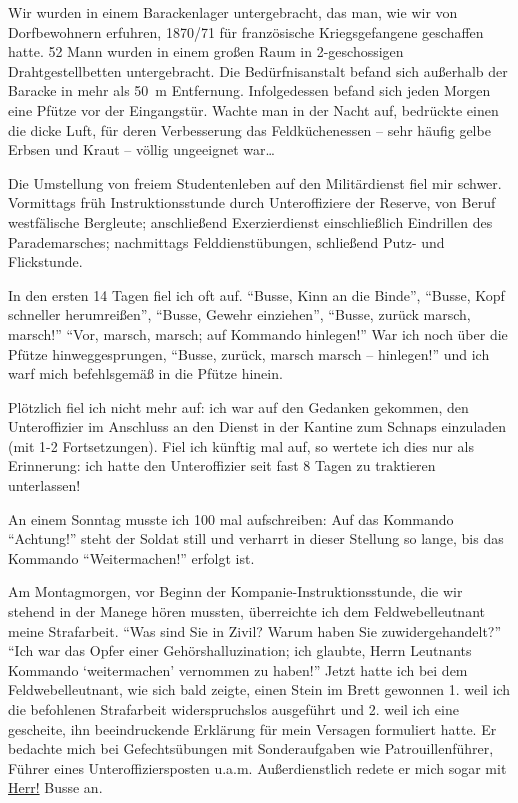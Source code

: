 \documentclass[a5paper,pagesize,10pt,twoside=true]{scrbook}
\begin{document}
Wir wurden in einem Barackenlager untergebracht, das man, wie wir von Dorfbewohnern erfuhren, 1870/71 für französische Kriegsgefangene geschaffen hatte. 52 Mann wurden in einem großen Raum in 2-geschossigen Drahtgestellbetten untergebracht. Die Bedürfnisanstalt befand sich außerhalb der Baracke in mehr als 50~m Entfernung. Infolgedessen befand sich jeden Morgen eine Pfütze vor der Eingangstür. Wachte man in der Nacht auf, bedrückte einen die dicke Luft, für deren Verbesserung das Feldküchenessen -- sehr häufig gelbe Erbsen und Kraut -- völlig ungeeignet war\dots

Die Umstellung von freiem Studentenleben auf den Militärdienst fiel mir schwer. Vormittags früh Instruktionsstunde durch Unteroffiziere der Reserve, von Beruf westfälische Bergleute; anschließend Exerzierdienst einschließlich Eindrillen des Parademarsches; nachmittags Felddienstübungen, schließend Putz- und Flickstunde.

In den ersten 14 Tagen fiel ich oft auf. \enquote{Busse, Kinn an die Binde}, \enquote{Busse, Kopf schneller herumreißen}, \enquote{Busse, Gewehr einziehen}, \enquote{Busse, zurück marsch, marsch!} \enquote{Vor, marsch, marsch; auf Kommando hinlegen!} War ich noch über die Pfütze hinweggesprungen, \enquote{Busse, zurück, marsch marsch -- hinlegen!} und ich warf mich befehlsgemäß in die Pfütze hinein.

Plötzlich fiel ich nicht mehr auf: ich war auf den Gedanken gekommen, den Unteroffizier im Anschluss an den Dienst in der Kantine zum Schnaps einzuladen (mit 1-2 Fortsetzungen). Fiel ich künftig mal auf, so wertete ich dies nur als Erinnerung: ich hatte den Unteroffizier seit fast 8 Tagen zu traktieren unterlassen!

An einem Sonntag musste ich 100 mal aufschreiben: Auf das Kommando \enquote{Achtung!} steht der Soldat still und verharrt in dieser Stellung so lange, bis das Kommando \enquote{Weitermachen!} erfolgt ist.

Am Montagmorgen, vor Beginn der Kompanie-Instruktionsstunde, die wir stehend in der Manege hören mussten, überreichte ich dem Feldwebelleutnant meine Strafarbeit. \enquote{Was sind Sie in Zivil? Warum haben Sie zuwidergehandelt?} \enquote{Ich war das Opfer einer Gehörshalluzination; ich glaubte, Herrn Leutnants Kommando \enquote{weitermachen} vernommen zu haben!} Jetzt hatte ich bei dem Feldwebelleutnant, wie sich bald zeigte, einen Stein im Brett gewonnen 1. weil ich die befohlenen Strafarbeit widerspruchslos ausgeführt und 2. weil ich eine gescheite, ihn beeindruckende Erklärung für mein Versagen formuliert hatte. Er bedachte mich bei Gefechtsübungen mit Sonderaufgaben wie Patrouillenführer, Führer eines Unteroffiziersposten u.a.m. Außerdienstlich redete er mich sogar mit \underline{Herr!} Busse an.
\end{document}
